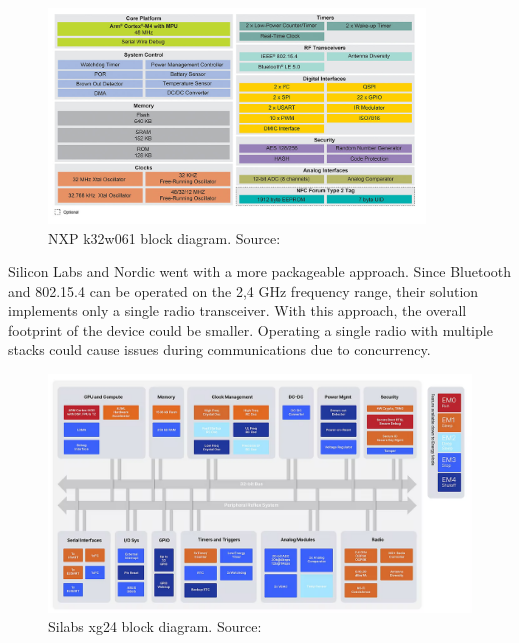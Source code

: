 \begin{figure}
    \centering
    \includegraphics[width=100mm, keepaspectratio]{figures/nxp_k32w061_41-block-dia.png}
    \caption{NXP k32w061 block diagram. Source: \cite{nxp}}
    \label{fig:mp:nxp-dia}
\end{figure}

Silicon Labs and Nordic went with a more packageable approach. Since Bluetooth and 802.15.4 can be operated on the 2,4 GHz frequency range, their solution implements only a single radio transceiver. With this approach, the overall footprint of the device could be smaller. Operating a single radio with multiple stacks could cause issues during communications due to concurrency.

\begin{figure}
    \centering
    \includegraphics[width=120mm, keepaspectratio]{figures/silabs_xg24-block-diagram.png}
    \caption{Silabs xg24 block diagram. Source: \cite{mg24}}
    \label{fig:mp:silabs-dia}
\end{figure}


